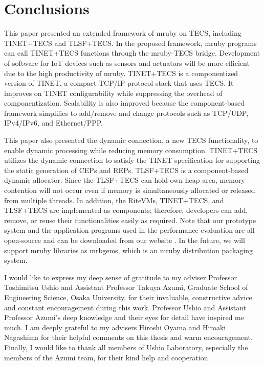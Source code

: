 \documentclass[a4j,12pt,oneside,openany,english]{jsbook}
\begin{document}
\chapter{Conclusions}
\label{sec:Conclusion}

This paper presented an extended framework of mruby on TECS, including TINET+TECS and TLSF+TECS.
In the proposed framework, mruby programs can call TINET+TECS functions through the mruby-TECS bridge.
Development of software for IoT devices such as sensors and actuators will be more efficient due to the high productivity of mruby.
TINET+TECS is a componentized version of TINET, a compact TCP/IP protocol stack that uses TECS.
It improves on TINET configurability while suppressing the overhead of componentization.
Scalability is also improved because the component-based framework simplifies to add/remove and change protocols such as TCP/UDP, IPv4/IPv6, and Ethernet/PPP.

This paper also presented the dynamic connection, a new TECS functionality, to enable dynamic processing while reducing memory consumption.
TINET+TECS utilizes the dynamic connection to satisfy the TINET specification for supporting the static generation of CEPs and REPs.
TLSF+TECS is a component-based dynamic allocator.
Since the TLSF+TECS can hold own heap area, memory contention will not occur even if memory is simultaneously allocated or released from multiple threads.
In addition, the RiteVMs, TINET+TECS, and TLSF+TECS are implemented as components; therefore, developers can add, remove, or reuse their functionalities easily as required.
Note that our prototype system and the application programs used in the performance evaluation are all open-source and can be downloaded from our website \cite{url:TECS}.
In the future, we will support mruby libraries as mrbgems, which is an mruby distribution packaging system.

\begin{acknowledgment}
I would like to express my deep sense of gratitude to my adviser Professor Toshimitsu Ushio and Assistant Professor Takuya Azumi, Graduate School of Engineering Science, Osaka University, for their invaluable, constructive advice and constant encouragement during this work.
Professor Ushio and Assistant Professor Azumi's deep knowledge and their eyes for detail have inspired me much.
I am deeply grateful to my advisers Hiroshi Oyama and Hiroaki Nagashima for their helpful comments on this thesis and warm encouragement.
Finally, I would like to thank all members of Ushio Laboratory, especially the members of the Azumi team, for their kind help and cooperation.
\end{acknowledgment}
\end{document}
